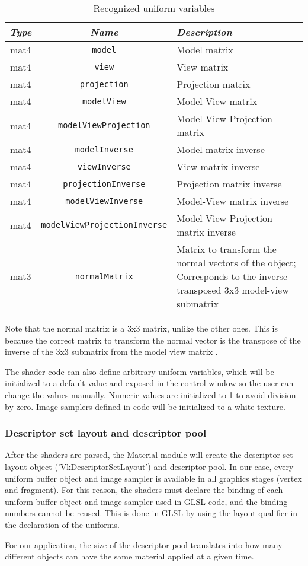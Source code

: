 \begin{table}[h]
    \centering
    \caption{Recognized uniform variables}
    \begin{tabular}{|c|c|p{6cm}|}
        \hline
        \textit{Type} & \textit{Name} & \textit{Description} \\
        \hline
        \hline
        mat4 & \texttt{model} & Model matrix \\
        mat4 & \texttt{view} & View matrix \\
        mat4 & \texttt{projection} & Projection matrix \\
        mat4 & \texttt{modelView} & Model-View matrix \\
        mat4 & \texttt{modelViewProjection} & Model-View-Projection matrix \\
        mat4 & \texttt{modelInverse} & Model matrix inverse \\
        mat4 & \texttt{viewInverse} & View matrix inverse \\
        mat4 & \texttt{projectionInverse} & Projection matrix inverse \\
        mat4 & \texttt{modelViewInverse} & Model-View matrix inverse \\
        mat4 & \texttt{modelViewProjectionInverse} & Model-View-Projection matrix inverse \\
        mat3 & \texttt{normalMatrix} & Matrix to transform the normal vectors of the object; Corresponds to the inverse transposed 3x3 model-view submatrix \\
        \hline
    \end{tabular}
    \label{tab:uniform_variables}
\end{table}

Note that the normal matrix is a 3x3 matrix, unlike the other ones. This is because the correct matrix to transform the normal vector is the transpose of the inverse of the 3x3 submatrix from the model view matrix \cite{normal_matrix}.

The shader code can also define arbitrary uniform variables, which will be initialized to a default value and exposed in the control window so the user can change the values manually. Numeric values are initialized to 1 to avoid division by zero. Image samplers defined in code will be initialized to a white texture.

\subsubsection{Descriptor set layout and descriptor pool}
After the shaders are parsed, the Material module will create the descriptor set layout object ('VkDescriptorSetLayout') and descriptor pool. In our case, every uniform buffer object and image sampler is available in all graphics stages (vertex and fragment). For this reason, the shaders must declare the binding of each uniform buffer object and image sampler used in GLSL code, and the binding numbers cannot be reused. This is done in GLSL by using the layout qualifier in the declaration of the uniforms.

For our application, the size of the descriptor pool translates into how many different objects can have the same material applied at a given time.
